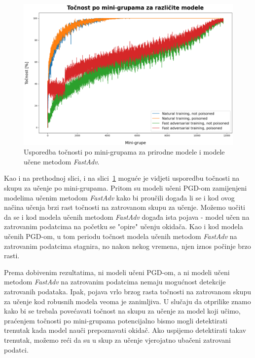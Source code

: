 \documentclass[times, utf8, zavrsni, numeric]{fer}
\begin{document}
\pagebreak

\begin{figure}[htb]
    \centering
    \includegraphics[scale=0.4]{../stats/train_accuracy_comparison_nat_fast.png}
    \caption{Usporedba točnosti po mini-grupama za prirodne modele i modele učene metodom \textit{FastAdv}.}
    \label{fig:fast_nat_poisoned_comparison}
\end{figure}

Kao i na prethodnoj slici, i na slici~\ref{fig:fast_nat_poisoned_comparison} moguće je vidjeti usporedbu točnosti na skupu za učenje po mini-grupama.
Pritom su modeli učeni PGD-om zamijenjeni modelima učenim metodom \textit{FastAdv} kako bi proučili događa li se i kod ovog načina učenja brzi rast točnosti na zatrovanom skupu za učenje.
Možemo uočiti da se i kod modela učenih metodom \textit{FastAdv} događa ista pojava - model učen na zatrovanim podatcima na početku se "opire" učenju okidača.
Kao i kod modela učenih PGD-om, u tom periodu točnost modela učenih metodom \textit{FastAdv} na zatrovanim podatcima stagnira, no nakon nekog vremena, njen iznos počinje brzo rasti.

Prema dobivenim rezultatima, ni modeli učeni PGD-om, a ni modeli učeni metodom \textit{FastAdv} na zatrovanim podatcima nemaju mogućnost detekcije zatrovanih podataka.
Ipak, pojava vrlo brzog rasta točnosti na zatrovanom skupu za učenje kod robusnih modela veoma je zanimljiva.
U slučaju da otprilike znamo kako bi se trebala povećavati točnost na skupu za učenje za model koji učimo, 
praćenjem točnosti po mini-grupama potencijalno bismo mogli detektirati trenutak kada model nauči prepoznavati okidač. 
Ako uspijemo detektirati takav trenutak, možemo reći da su u skup za učenje vjerojatno ubačeni zatrovani podatci.
\end{document}
